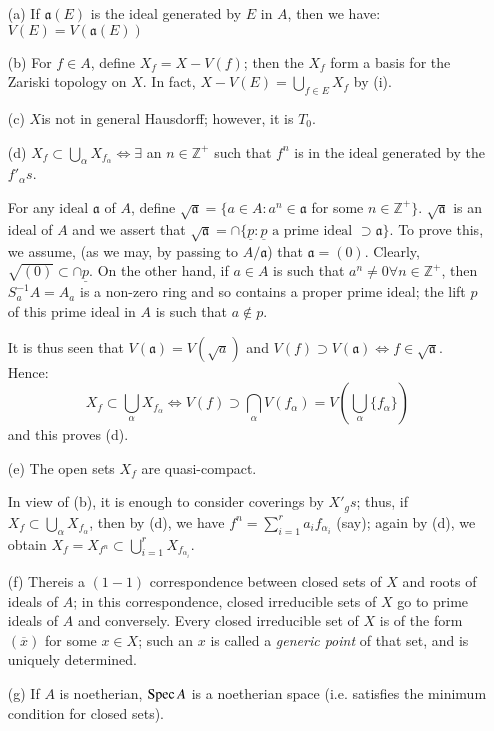 \setcounter{chapremarks}{2}
\begin{chapremarks}\label{chap1-rems1.3}%
\begin{itemize}
\item[(a)] If $\mathfrak{a}(E)$ is the ideal generated by $E$ in
  $A$, then we have: $V(E)=V(\mathfrak{a}(E))$

\item[(b)] For $f\in A$, define $X_{f}=X-V(f)$; then the $X_{f}$
  form a basis for the Zariski topology on $X$. In fact,
  $X-V(E)=\bigcup\limits_{f\in E}X_{f}$ by (i).

\item[(c)] $X$\pageoriginale is not in general Hausdorff; however, it
  is $T_{0}$. 

\item[(d)] $X_{f}\subset
  \bigcup\limits_{\alpha}X_{f_{\alpha}}\Longleftrightarrow \exists$ an
  $n\in\mathbb{Z}^{+}$ such that $f^{n}$ is in the ideal generated by
  the $f'_{\alpha}s$.

For any ideal $\mathfrak{a}$ of $A$, define
$\sqrt{\mathfrak{a}}=\{a\in A:a^{n}\in\mathfrak{a}$ for some
$n\in\mathbb{Z}^{+}\}$. $\sqrt{\mathfrak{a}}$ is an ideal of $A$ and
we assert that $\sqrt{\mathfrak{a}}=\cap
\{\underline{p}:\underline{p}\text{ a prime ideal }\supset
\mathfrak{a}\}$. To prove this, we assume, (as we may, by passing to
$A/\mathfrak{a}$) that $\mathfrak{a}=(0)$. Clearly, $\sqrt{(0)}\subset
\cap \underline{p}$. On the other hand, if $a\in A$ is such that
$a^{n}\neq 0\forall n\in\mathbb{Z}^{+}$, then $S^{-1}_{a}A=A_{a}$ is a
non-zero ring and so contains a proper prime ideal; the lift $p$ of
this prime ideal in $A$ is such that $a\not\in p$.

It is thus seen that $V(\mathfrak{a})=V(\sqrt{a})$ and $V(f)\supset
V(\mathfrak{a})\Longleftrightarrow f\in\sqrt{\mathfrak{a}}$. Hence:
$$
X_{f}\subset \bigcup_{\alpha}X_{f_{\alpha}}\Longleftrightarrow
V(f)\supset
\bigcap_{\alpha}V(f_{\alpha})=V(\bigcup_{\alpha}\{f_{\alpha}\}) 
$$
and this proves (d).

\item[(e)] The open sets $X_{f}$ are quasi-compact.

In view of (b), it is enough to consider coverings by $X'_{g}s$; thus,
if $X_{f}\subset \bigcup\limits_{\alpha}X_{f_{\alpha}}$, then by (d),
we have $f^{n}=\sum\limits^{r}_{i=1}a_{i}f_{\alpha_{i}}$ (say); again
by (d), we obtain $X_{f}=X_{f^{n}}\subset
\bigcup\limits^{r}_{i=1}X_{f_{\alpha_{i}}}$. 

\item[(f)] There\pageoriginale is a $(1-1)$ correspondence between
  closed sets of 
  $X$ and roots of ideals of $A$; in this correspondence, closed
  irreducible sets of $X$ go to prime ideals of $A$ and
  conversely. Every closed irreducible set of $X$ is of the form
  $(\overline{x})$ for some $x\in X$; such an $x$ is called a {\em
    generic point} of that set, and is uniquely determined.

\item[(g)] If $A$ is noetherian, $\operatorname{Spec} A$ is a noetherian space
  (i.e. satisfies the minimum condition for closed sets).
\end{itemize}
\end{chapremarks}

